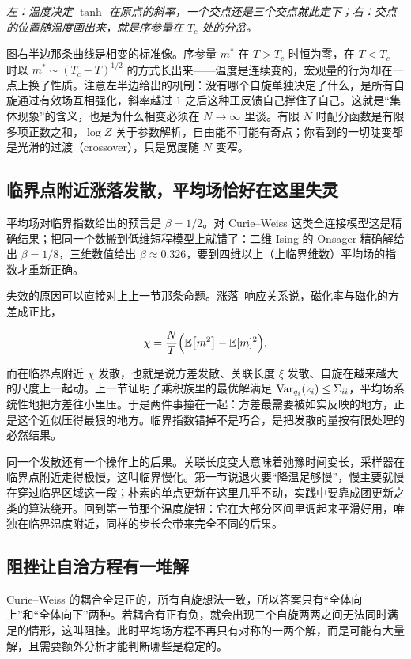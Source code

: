 \emph{左：温度决定 \(\tanh\) 在原点的斜率，一个交点还是三个交点就此定下；右：交点的位置随温度画出来，就是序参量在 \(T_c\) 处的分岔。}

图右半边那条曲线是相变的标准像。序参量 \(m^{*}\) 在 \(T>T_c\) 时恒为零，在 \(T<T_c\) 时以 \(m^{*}\sim(T_c-T)^{1/2}\) 的方式长出来——温度是连续变的，宏观量的行为却在一点上换了性质。注意左半边给出的机制：没有哪个自旋单独决定了什么，是所有自旋通过有效场互相强化，斜率越过 \(1\) 之后这种正反馈自己撑住了自己。这就是``集体现象''的含义，也是为什么相变必须在 \(N\to\infty\) 里谈。有限 \(N\) 时配分函数是有限多项正数之和，\(\log Z\) 关于参数解析，自由能不可能有奇点；你看到的一切陡变都是光滑的过渡（crossover），只是宽度随 \(N\) 变窄。

\subsection{临界点附近涨落发散，平均场恰好在这里失灵}

平均场对临界指数给出的预言是 \(\beta=1/2\)。对 Curie--Weiss 这类全连接模型这是精确结果；把同一个数搬到低维短程模型上就错了：二维 Ising 的 Onsager 精确解给出 \(\beta=1/8\)，三维数值给出 \(\beta\approx0.326\)，要到四维以上（上临界维数）平均场的指数才重新正确。

失效的原因可以直接对上上一节那条命题。涨落--响应关系说，磁化率与磁化的方差成正比，

\[
\chi=\frac{N}{T}\Bigl(\mathbb{E}\bigl[m^2\bigr]-\mathbb{E}[m]^2\Bigr),
\]

而在临界点附近 \(\chi\) 发散，也就是说方差发散、关联长度 \(\xi\) 发散、自旋在越来越大的尺度上一起动。上一节证明了乘积族里的最优解满足 \(\operatorname{Var}_{q_i}(z_i)\le\Sigma_{ii}\)，平均场系统性地把方差往小里压。于是两件事撞在一起：方差最需要被如实反映的地方，正是这个近似压得最狠的地方。临界指数错掉不是巧合，是把发散的量按有限处理的必然结果。

同一个发散还有一个操作上的后果。关联长度变大意味着弛豫时间变长，采样器在临界点附近走得极慢，这叫临界慢化。第一节说退火要``降温足够慢''，慢主要就慢在穿过临界区域这一段；朴素的单点更新在这里几乎不动，实践中要靠成团更新之类的算法绕开。回到第一节那个温度旋钮：它在大部分区间里调起来平滑好用，唯独在临界温度附近，同样的步长会带来完全不同的后果。

\subsection{阻挫让自洽方程有一堆解}

Curie--Weiss 的耦合全是正的，所有自旋想法一致，所以答案只有``全体向上''和``全体向下''两种。若耦合有正有负，就会出现三个自旋两两之间无法同时满足的情形，这叫阻挫。此时平均场方程不再只有对称的一两个解，而是可能有大量解，且需要额外分析才能判断哪些是稳定的。

